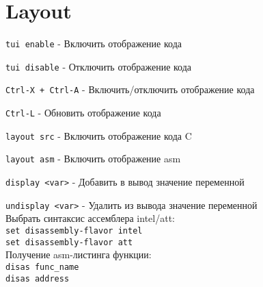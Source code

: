\section{Layout}

\noindent \texttt{tui enable} - Включить отображение кода

\noindent \texttt{tui disable} - Отключить отображение кода

\noindent \texttt{Ctrl-X + Ctrl-A} - Включить/отключить отображение кода

\noindent \texttt{Ctrl-L} - Обновить отображение кода

\noindent \texttt{layout src} - Включить отображение кода C

\noindent \texttt{layout asm} - Включить отображение asm

\noindent \texttt{display <var>} - Добавить в вывод значение переменной

\noindent \texttt{undisplay <var>} - Удалить из вывода значение переменной
\\

\noindent Выбрать синтаксис ассемблера intel/att: \\
\indent \texttt{set disassembly-flavor intel} \\
\indent \texttt{set disassembly-flavor att} \\

\noindent Получение asm-листинга функции: \\
\indent \texttt{disas func\_name} \\
\indent \texttt{disas address}